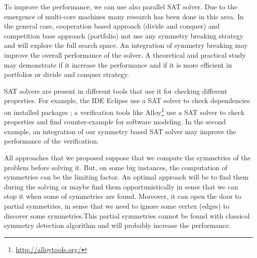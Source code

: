 To improve the performance, we can use also parallel SAT solver. Due to the emergence of multi-core machines
many research has been done in this area. In the general case, cooperation based approach (divide and conquer) and
competition base approach (portfolio)  not use any symmetry breaking strategy and will explore the full search space.
An integration of symmetry breaking may improve the overall performance of the solver.
A theoretical and practical study may demonstrate if it increase the performance and if it is more efficient in 
portfolios or divide and conquer strategy.


SAT solvers are present in different tools that use it for checking different properties. For example, 
the IDE Eclipse use a SAT solver to check dependencies on installed packages \cite{le2008sat};
a verification tools like Alloy\footnote{\url{http://alloytools.org/}} use a SAT solver to check properties and find
counter-example for software modeling. In the second example, an integration of our symmetry based SAT solver may improve the performance of the verification.


All approaches that we proposed suppose that we compute the symmetries of the problem before solving it.
But, on some big instances, the computation of symmetries can be the limiting factor. An optimal approach
will be to find them during the solving or maybe find them opportunistically in sense that we can stop it when some of 
symmetries are found.
Moreover, it can open the door to partial symmetries, in sense that we need to ignore some vertex (edges) to discover
some symmetries.This partial symmetries cannot be found with classical symmetry detection algorithm and will probably
increase the performance.






 

